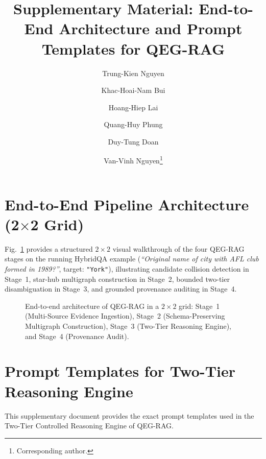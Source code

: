 \documentclass[runningheads]{llncs}
\begin{document}
\title{Supplementary Material: End-to-End Architecture and Prompt Templates for QEG-RAG}
\author{Trung-Kien Nguyen \and
Khac-Hoai-Nam Bui \and
Hoang-Hiep Lai \and
Quang-Huy Phung \and
Duy-Tung Doan \and
Van-Vinh Nguyen\thanks{Corresponding author.}}
\maketitle

\appendix
\section{End-to-End Pipeline Architecture (2$\times$2 Grid)}
\label{sec:appendix_pipeline}

Fig.~\ref{fig:appendix_pipeline} provides a structured $2\times 2$ visual walkthrough of the four QEG-RAG stages on the running HybridQA example (\textit{``Original name of city with AFL club formed in 1989?''}, target: \texttt{"York"}), illustrating candidate collision detection in Stage~1, star-hub multigraph construction in Stage~2, bounded two-tier disambiguation in Stage~3, and grounded provenance auditing in Stage~4.

\begin{figure}[htbp]
\centering

\caption{End-to-end architecture of QEG-RAG in a $2\times 2$ grid: Stage~1 (Multi-Source Evidence Ingestion), Stage~2 (Schema-Preserving Multigraph Construction), Stage~3 (Two-Tier Reasoning Engine), and Stage~4 (Provenance Audit).}
\label{fig:appendix_pipeline}
\end{figure}

\section{Prompt Templates for Two-Tier Reasoning Engine}
\label{sec:prompt_templates}

This supplementary document provides the exact prompt templates used in the Two-Tier Controlled Reasoning Engine of QEG-RAG.
\end{document}
